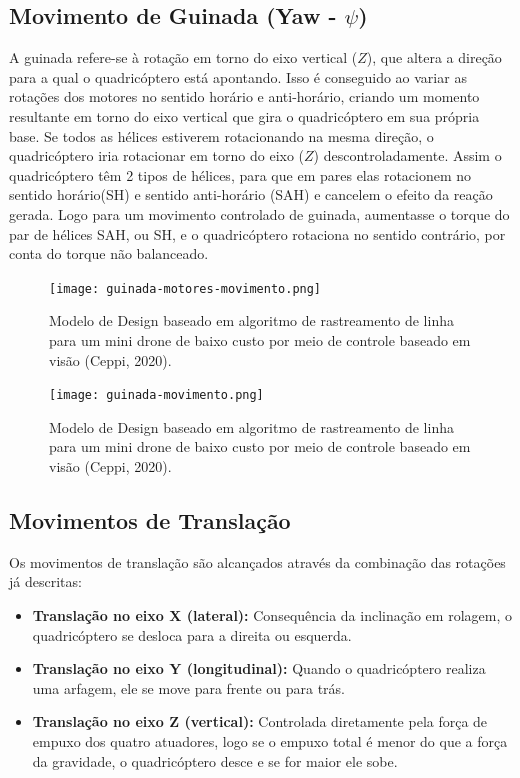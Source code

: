 \subsection{Movimento de Guinada (Yaw - $\psi$)}
A guinada refere-se à rotação em torno do eixo vertical ($Z$), que altera a direção para a qual o quadricóptero está apontando. Isso é conseguido ao variar as rotações dos motores no sentido horário e anti-horário, criando um momento resultante em torno do eixo vertical que gira o quadricóptero em sua própria base. Se todos as hélices estiverem rotacionando na mesma direção, o quadricóptero iria rotacionar em torno do eixo ($Z$) descontroladamente. Assim o quadricóptero têm 2 tipos de hélices, para que em pares elas rotacionem no sentido horário(SH) e sentido anti-horário (SAH) e cancelem o efeito da reação gerada. Logo para um movimento controlado de guinada, aumentasse o torque do par de hélices SAH, ou SH, e o quadricóptero rotaciona no sentido contrário, por conta do torque não balanceado.

\begin{figure}[ht]
	\centering
	\texttt{[image: guinada-motores-movimento.png]} %
	\caption{Modelo de Design baseado em algoritmo de rastreamento de linha para um mini drone de baixo custo por meio de controle baseado em visão (Ceppi, 2020).}
	\label{fig:line_tracking_algorithm}
\end{figure}


\begin{figure}[ht]
	\centering
	\texttt{[image: guinada-movimento.png]} %
	\caption{Modelo de Design baseado em algoritmo de rastreamento de linha para um mini drone de baixo custo por meio de controle baseado em visão (Ceppi, 2020).}
	\label{fig:line_tracking_algorithm}
\end{figure}




\subsection{Movimentos de Translação}
Os movimentos de translação são alcançados através da combinação das rotações já descritas:

\begin{itemize}
	\item \textbf{Translação no eixo X (lateral):} Consequência da inclinação em rolagem, o quadricóptero se desloca para a direita ou esquerda.
	\item \textbf{Translação no eixo Y (longitudinal):} Quando o quadricóptero realiza uma arfagem, ele se move para frente ou para trás.
	\item \textbf{Translação no eixo Z (vertical):} Controlada diretamente pela força de empuxo dos quatro atuadores, logo se o empuxo total é menor do que a força da gravidade, o quadricóptero desce e se for maior ele sobe.
\end{itemize}

